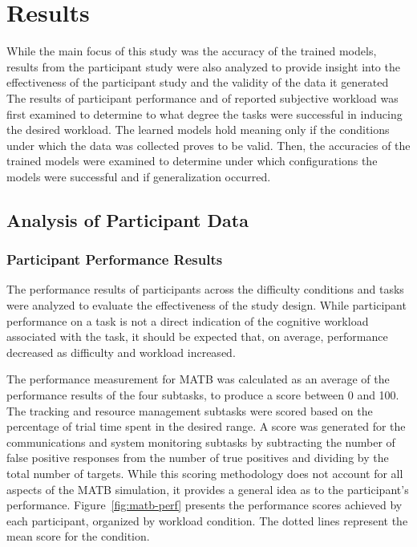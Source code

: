 \documentclass[11pt]{article}
\begin{document}
\section{Results}
While the main focus of this study was the accuracy of the trained models, results from the participant study were also analyzed to provide insight into the effectiveness of the participant study and the validity of the data it generated The results of participant performance and of reported subjective workload was first examined to determine to what degree the tasks were successful in inducing the desired workload. The learned models hold meaning only if the conditions under which the data was collected proves to be valid. Then, the accuracies of the trained models were examined to determine under which configurations the models were successful and if generalization occurred. 

	\subsection{Analysis of Participant Data}
		\subsubsection{Participant Performance Results}
		The performance results of participants across the difficulty conditions and tasks were analyzed to evaluate the effectiveness of the study design. While participant performance on a task is not a direct indication of the cognitive workload associated with the task, it should be expected that, on average, performance decreased as difficulty and workload increased.  

		The performance measurement for MATB was calculated as an average of the performance results of the four subtasks, to produce a score between 0 and 100. The tracking and resource management subtasks were scored based on the percentage of trial time spent in the desired range. A score was generated for the communications and system monitoring subtasks by subtracting the number of false positive responses from the number of true positives and dividing by the total number of targets. While this scoring methodology does not account for all aspects of the MATB simulation, it provides a general idea as to the participant's performance. Figure~\ref{fig:matb-perf} presents the performance scores achieved by each participant, organized by workload condition. The dotted lines represent the mean score for the condition. 
		
\end{document}
